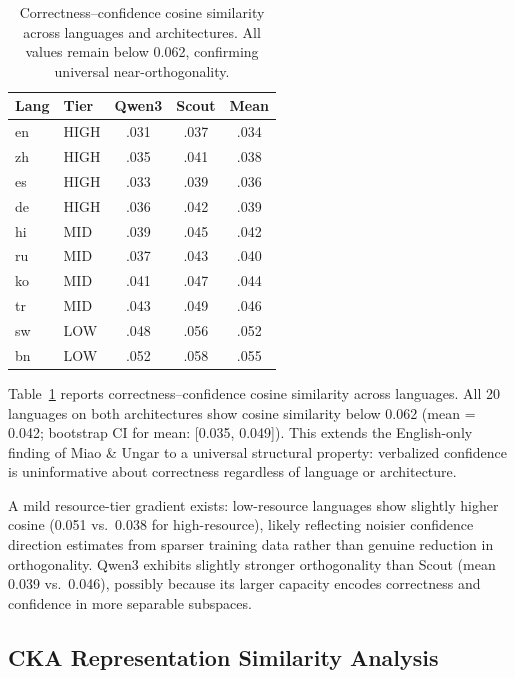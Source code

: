 \documentclass[11pt,a4paper]{article}
\begin{document}
\begin{table}[t]
\centering
\small
\begin{tabular}{@{}llccc@{}}
\toprule
\textbf{Lang} & \textbf{Tier} & \textbf{Qwen3} & \textbf{Scout} & \textbf{Mean} \\
\midrule
en & HIGH & .031 & .037 & .034 \\
zh & HIGH & .035 & .041 & .038 \\
es & HIGH & .033 & .039 & .036 \\
de & HIGH & .036 & .042 & .039 \\
hi & MID  & .039 & .045 & .042 \\
ru & MID  & .037 & .043 & .040 \\
ko & MID  & .041 & .047 & .044 \\
tr & MID  & .043 & .049 & .046 \\
sw & LOW  & .048 & .056 & .052 \\
bn & LOW  & .052 & .058 & .055 \\
\bottomrule
\end{tabular}
\caption{Correctness--confidence cosine similarity across languages and architectures. All values remain below 0.062, confirming universal near-orthogonality.}
\label{tab:ortho}
\end{table}

Table~\ref{tab:ortho} reports correctness--confidence cosine similarity across languages.
All 20 languages on both architectures show cosine similarity below 0.062 (mean = 0.042; bootstrap CI for mean: [0.035, 0.049]).
This extends the English-only finding of Miao \& Ungar to a universal structural property: verbalized confidence is uninformative about correctness regardless of language or architecture.

A mild resource-tier gradient exists: low-resource languages show slightly higher cosine (0.051 vs.\ 0.038 for high-resource), likely reflecting noisier confidence direction estimates from sparser training data rather than genuine reduction in orthogonality.
Qwen3 exhibits slightly stronger orthogonality than Scout (mean 0.039 vs.\ 0.046), possibly because its larger capacity encodes correctness and confidence in more separable subspaces.

\subsection{CKA Representation Similarity Analysis}
\label{sec:exp:cka}
\end{document}
